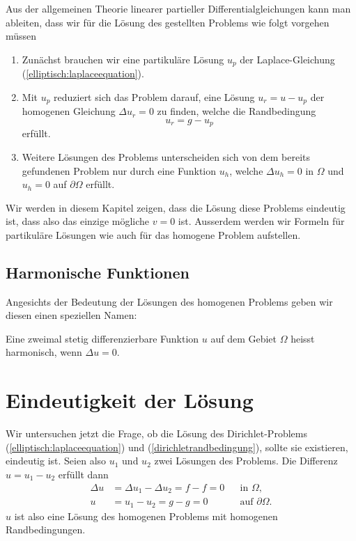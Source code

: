 Aus der allgemeinen Theorie linearer partieller Differentialgleichungen
kann man ableiten, dass wir für
die Lösung des gestellten Problems wie folgt vorgehen müssen
\begin{enumerate}
\item Zunächst brauchen wir eine partikuläre
Lösung $u_p$ der Laplace-Gleichung (\ref{elliptisch:laplaceequation}).
\item Mit $u_p$ reduziert sich das Problem darauf, eine Lösung
$u_r=u-u_p$ der homogenen Gleichung $\Delta u_r=0$
zu finden, welche die Randbedingung
\[
u_r=g-u_p
\]
erfüllt.
\item
Weitere Lösungen des Problems unterscheiden sich von dem
bereits gefundenen Problem nur durch eine Funktion $u_h$, welche
$\Delta u_h=0$ in $\Omega$ und $u_h=0$ auf $\partial\Omega$ erfüllt.
\end{enumerate}
Wir werden in diesem Kapitel zeigen, dass die Lösung diese Problems
eindeutig ist, dass also das einzige mögliche $v=0$ ist.
Ausserdem werden wir Formeln für partikuläre Lösungen wie auch für
das homogene Problem aufstellen.

\subsection{Harmonische Funktionen}
Angesichts der Bedeutung der Lösungen des homogenen Problems
geben wir diesen einen speziellen Namen:

\begin{definition}
Eine zweimal stetig differenzierbare Funktion $u$ auf dem Gebiet $\Omega$
heisst harmonisch, wenn $\Delta u=0$.
\end{definition}

\section{Eindeutigkeit der Lösung}
Wir untersuchen jetzt die Frage, ob die Lösung des 
Dirichlet-Problems (\ref{elliptisch:laplaceequation}) und
(\ref{dirichletrandbedingung}), sollte sie existieren, eindeutig ist.
Seien also $u_1$ und $u_2$ zwei Lösungen des Problems. Die Differenz
$u=u_1-u_2$ erfüllt dann
\[
\begin{aligned}
\Delta u&=\Delta u_1-\Delta u_2=f-f=0&&\text{in $\Omega$,}\\
u&=u_1-u_2=g-g=0&&\text{auf $\partial\Omega$.}
\end{aligned}
\]
$u$ ist also eine Lösung des homogenen Problems mit homogenen
Randbedingungen.

